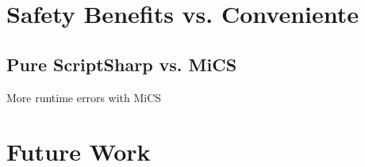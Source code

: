 
\section{Safety Benefits vs. Conveniente} %
\label{sec:safety_benefits_vs_conveniente}

\subsection{Pure ScriptSharp vs. MiCS} %
\label{sub:pure_scriptsharp_vs_mics}
More runtime errors with MiCS


\section{Future Work}